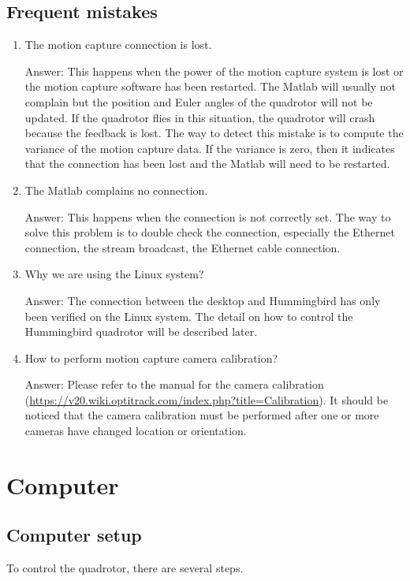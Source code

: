 \documentclass[idxtotoc,hyperref,openany]{labbook} %
\begin{document}
\subsection{Frequent mistakes}
\begin{enumerate}
\item The motion capture connection is lost. 

Answer: This happens when the power of the motion capture system is lost or the motion capture software has been restarted.  The Matlab will usually not complain but the position and Euler angles of the quadrotor will not be updated. If the quadrotor flies in this situation, the quadrotor will crash because the feedback is lost. The way to detect this mistake is to compute the variance of the motion capture data. If the variance is zero, then it indicates that the connection has been lost and the Matlab will need to be restarted. 
\item The Matlab complains no connection.

Answer: This happens when the connection is not correctly set. The way to solve this problem is to double check the connection, especially the Ethernet connection, the stream broadcast, the Ethernet cable connection.

\item Why we are using the Linux system?

Answer: The connection between the desktop and Hummingbird has only been verified on the Linux system. The detail on how to control the Hummingbird quadrotor will be described later. 

\item How to perform motion capture camera calibration?

Answer: Please refer to the manual for the camera calibration (\url{https://v20.wiki.optitrack.com/index.php?title=Calibration}). It should be noticed that the camera calibration must be performed after one or more cameras have changed location or orientation. 
\end{enumerate}

\newpage
\section{Computer}
\subsection{Computer setup}
To control the quadrotor, there are several steps.
\end{document}
